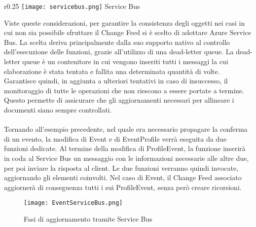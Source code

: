 \begin{wrapfigure}{r}{0.25\textwidth}
    \centering
    \texttt{[image: servicebus.png]}
    Service Bus
\end{wrapfigure}
Viste queste considerazioni,
per garantire la consistenza degli oggetti nei casi in cui non sia possibile sfruttare il Change Feed
si è scelto di adottare Azure Service Bus.
La scelta deriva principalmente dalla suo supporto nativo al controllo dell'esecuzione delle funzioni,
grazie all'utilizzo di una dead-letter queue.
La dead-letter queue è un contenitore in cui vengono inseriti
tutti i messaggi la cui elaborazione è stata tentata e fallita una determinata quantità di volte.
Garantisce quindi, in aggiunta a ulteriori tentativi in caso di insuccesso,
il monitoraggio di tutte le operazioni che non riescono a essere portate a termine.
Questo permette di assicurare che gli aggiornamenti necessari per allineare i documenti
siano sempre controllati.\\
\\
Tornando all'esempio precedente,
nel quale era necessario propagare la conferma di un evento,
la modifica di Event e di EventProfile verrà eseguita da due funzioni dedicate.
Al termine della modifica di ProfileEvent,
la funzione inserirà in coda al Service Bus un messaggio
con le informazioni necessarie alle altre due,
per poi inviare la risposta al client.
Le due funzioni verranno quindi invocate,
aggiornando gli elementi coinvolti.
Nel caso di Event, il Change Feed associato aggiornerà di conseguenza
tutti i sui ProfileEvent, senza però creare ricorsioni.\\

\begin{figure}[h!]
    \centering
    \texttt{[image: EventServiceBus.png]}
    \caption{Fasi di aggiornamento tramite Service Bus}
\end{figure}




\clearpage